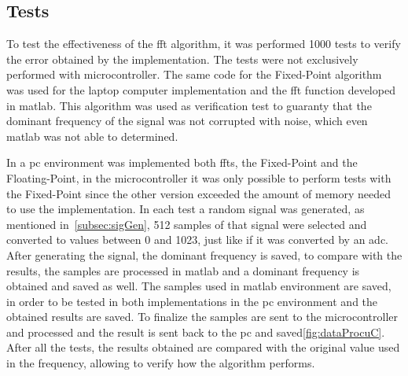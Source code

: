 \subsection{Tests}
To test the effectiveness of the \acrshort{fft} algorithm, it was performed 1000 tests to verify the error obtained by the implementation. The tests were not exclusively performed with microcontroller. The same code for the Fixed-Point algorithm was used for the laptop computer implementation and the \acrshort{fft} function developed in \acrshort{matlab}. This algorithm was used as verification test to guaranty
that the dominant frequency of the signal was not corrupted with noise, which even \acrshort{matlab} was not able to determined.

In a \acrshort{pc} environment was implemented both \acrshort{fft}s, the Fixed-Point and the Floating-Point, in the microcontroller it was only possible to perform tests with the Fixed-Point since the other version exceeded the amount of memory needed to use the implementation. In each test a random signal was generated, as mentioned in~\ref{subsec:sigGen}, 512 samples of that signal were selected and converted to values between 0 and 1023, just like if it was converted by an \acrshort{adc}. After generating the signal, the dominant frequency is saved, to compare with the results, the samples are processed in \acrshort{matlab} and a dominant frequency is obtained and saved as well. The samples used in \acrshort{matlab} environment are saved, in order to be tested in both implementations in the \acrshort{pc} environment and the obtained results are saved. To finalize the samples are sent to the microcontroller and processed and the result is sent back to the \acrshort{pc} and saved\ref{fig:dataProcuC}. After all the tests, the results obtained are compared with the original value used in the frequency, allowing to verify how the algorithm performs.

